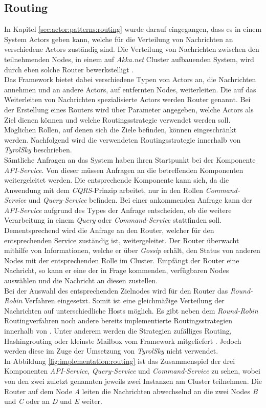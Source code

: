 \subsection{Routing}
\label{subsec:implementation:akkaRouting}
In Kapitel \ref{sec:actor:patterns:routing} wurde darauf eingegangen, dass es in einem System Actors geben kann, welche für die Verteilung von Nachrichten an verschiedene Actors zuständig sind. Die Verteilung von Nachrichten zwischen den teilnehmenden Nodes, in einem auf \textit{Akka.net} Cluster aufbauenden System, wird durch eben solche Router bewerkstelligt \citep{Akka.netCommunityAkka.NETDocumentation}. \\
Das Framework bietet dabei verschiedene Typen von Actors an, die Nachrichten annehmen und an andere Actors, auf entfernten Nodes, weiterleiten. Die auf das Weiterleiten von Nachrichten spezialisierte Actors werden Router genannt. Bei der Erstellung eines Routers wird über Parameter angegeben, welche Actors als Ziel dienen können und welche Routingsstrategie verwendet werden soll. Möglichen Rollen, auf denen sich die Ziele befinden, können eingeschränkt werden. Nachfolgend wird die verwendeten Routingsstrategie innerhalb von \textit{TyrolSky} beschrieben. \\
Sämtliche Anfragen an das System haben ihren Startpunkt bei der Komponente \textit{API-Service}. Von dieser müssen Anfragen an die betreffenden Komponenten weitergeleitet werden. Die entsprechende Komponente kann sich, da die Anwendung mit dem \textit{CQRS}-Prinzip arbeitet, nur in den Rollen \textit{Command-Service} und \textit{Query-Service} befinden. Bei einer ankommenden Anfrage kann der \textit{API-Service} aufgrund des Types der Anfrage entscheiden, ob die weitere Verarbeitung in einem \textit{Query} oder \textit{Command-Service} stattfinden soll. Dementsprechend wird die Anfrage an den Router, welcher für den entsprechenden Service zuständig ist, weitergeleitet. Der Router überwacht mithilfe von Informationen, welche er über \textit{Gossip} erhält, den Status von anderen Nodes mit der entsprechenden Rolle im Cluster. Empfängt der Router eine Nachricht, so kann er eine der in Frage kommenden, verfügbaren Nodes auswählen und die Nachricht an diesen zustellen. \\
Bei der Auswahl des entsprechenden Zielnodes wird für den Router das \textit{Round-Robin} Verfahren eingesetzt. Somit ist eine gleichmäßige Verteilung der Nachrichten auf unterschiedliche Hosts möglich. Es gibt neben dem \textit{Round-Robin} Routingverfahren noch andere bereits implementierte Routingsstrategien innerhalb von . Unter anderem werden die Strategien zufälliges Routing, Hashingrouting oder kleinste Mailbox vom Framework mitgeliefert \citep{Akka.netCommunityAkka.NETDocumentation}. Jedoch werden diese im Zuge der Umsetzung von \textit{TyrolSky} nicht verwendet. \\
In Abbildung \ref{fig:implementation:routing} ist das Zusammenspiel der drei Komponenten \textit{API-Service}, \textit{Query-Service} und \textit{Command-Service} zu sehen, wobei von den zwei zuletzt genannten jeweils zwei Instanzen am Cluster teilnehmen. Die Router auf dem Node \textit{A} leiten die Nachrichten abwechselnd an die zwei Nodes \textit{B} und \textit{C} oder an \textit{D} und \textit{E} weiter. 

